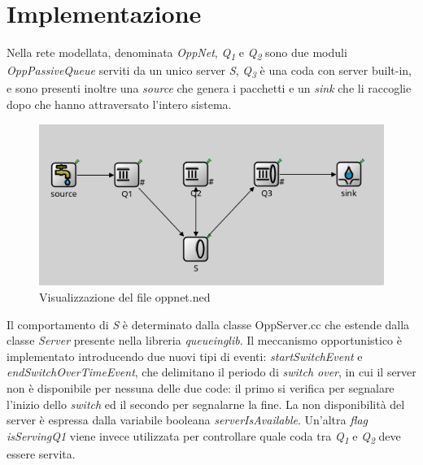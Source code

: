 \documentclass[a4paper,11pt]{article}
\begin{document}
\section{Implementazione}

Nella rete modellata, denominata \textit{OppNet}, \textit{Q\textsubscript{1}} e \textit{Q\textsubscript{2}} sono due moduli \textit{OppPassiveQueue} serviti da un unico server \textit{S}, \textit{Q\textsubscript{3}} è una coda con server built-in, e sono presenti inoltre una \textit{source} che genera i pacchetti e un \textit{sink} che li raccoglie dopo che hanno attraversato l'intero sistema.\newline

\begin{figure}[h!]
    \centering
    \includegraphics[width=\linewidth]{images/oppnet-mymodel.png}
    \caption{Visualizzazione del file oppnet.ned}
    \label{fig:2}
\end{figure}

Il comportamento di \textit{S} è determinato dalla classe OppServer.cc che estende dalla classe \textit{Server} presente nella libreria \textit{queueinglib}.\newline
Il meccanismo opportunistico è implementato introducendo due nuovi tipi di eventi: \textit{startSwitchEvent} e \textit{endSwitchOverTimeEvent}, che delimitano il periodo di \textit{switch over}, in cui il server non è disponibile per nessuna delle due code: il primo si verifica per segnalare l'inizio dello \textit{switch} ed il secondo per segnalarne la fine.\newline
La non disponibilità del server è espressa dalla variabile booleana \textit{serverIsAvailable}.\newline
Un'altra \textit{flag} \textit{isServingQ1} viene invece utilizzata per controllare quale coda tra \textit{Q\textsubscript{1}} e \textit{Q\textsubscript{2}} deve essere servita.
\end{document}
